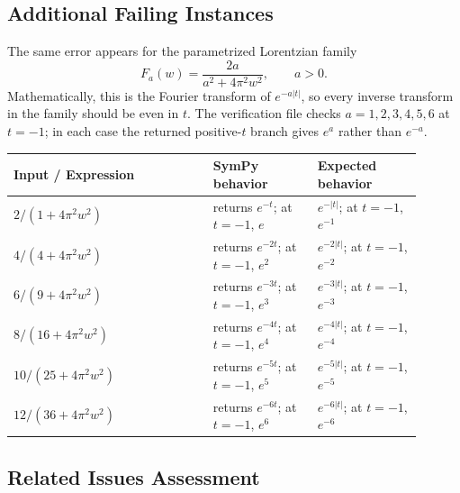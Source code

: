 \documentclass[11pt]{article}
\begin{document}
\subsection{Additional Failing Instances}

The same error appears for the parametrized Lorentzian family
\[
  F_a(w)=\frac{2a}{a^2+4\pi^2w^2}, \qquad a>0.
\]
Mathematically, this is the Fourier transform of \(e^{-a|t|}\), so every
inverse transform in the family should be even in \(t\).  The verification file
checks \(a=1,2,3,4,5,6\) at \(t=-1\); in each case the returned positive-\(t\)
branch gives \(e^a\) rather than \(e^{-a}\).

\begin{center}
\small
\renewcommand{\arraystretch}{1.3}
\begin{tabular}{@{}>{\raggedright\arraybackslash}p{0.44\linewidth}>{\raggedright\arraybackslash}p{0.23\linewidth}>{\raggedright\arraybackslash}p{0.23\linewidth}@{}}
\toprule
\textbf{Input / Expression} & \textbf{SymPy behavior} & \textbf{Expected behavior} \\
\midrule
\(2/(1+4\pi^2w^2)\) & returns \(e^{-t}\); at \(t=-1\), \(e\) & \(e^{-|t|}\); at \(t=-1\), \(e^{-1}\) \\
\(4/(4+4\pi^2w^2)\) & returns \(e^{-2t}\); at \(t=-1\), \(e^2\) & \(e^{-2|t|}\); at \(t=-1\), \(e^{-2}\) \\
\(6/(9+4\pi^2w^2)\) & returns \(e^{-3t}\); at \(t=-1\), \(e^3\) & \(e^{-3|t|}\); at \(t=-1\), \(e^{-3}\) \\
\(8/(16+4\pi^2w^2)\) & returns \(e^{-4t}\); at \(t=-1\), \(e^4\) & \(e^{-4|t|}\); at \(t=-1\), \(e^{-4}\) \\
\(10/(25+4\pi^2w^2)\) & returns \(e^{-5t}\); at \(t=-1\), \(e^5\) & \(e^{-5|t|}\); at \(t=-1\), \(e^{-5}\) \\
\(12/(36+4\pi^2w^2)\) & returns \(e^{-6t}\); at \(t=-1\), \(e^6\) & \(e^{-6|t|}\); at \(t=-1\), \(e^{-6}\) \\
\bottomrule
\end{tabular}
\end{center}

\subsection{Related Issues Assessment}
\end{document}
